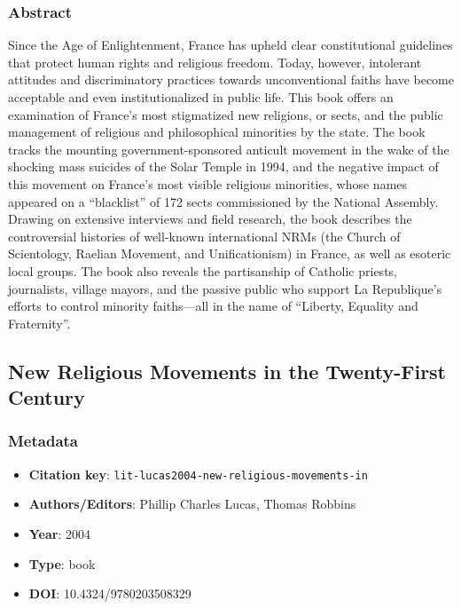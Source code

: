 \subsubsection*{Abstract}
Since the Age of Enlightenment, France has upheld clear constitutional guidelines that protect human rights and religious freedom. Today, however, intolerant attitudes and discriminatory practices towards unconventional faiths have become acceptable and even institutionalized in public life. This book offers an examination of France's most stigmatized new religions, or sects, and the public management of religious and philosophical minorities by the state. The book tracks the mounting government-sponsored anticult movement in the wake of the shocking mass suicides of the Solar Temple in 1994, and the negative impact of this movement on France's most visible religious minorities, whose names appeared on a “blacklist” of 172 sects commissioned by the National Assembly. Drawing on extensive interviews and field research, the book describes the controversial histories of well-known international NRMs (the Church of Scientology, Raelian Movement, and Unificationism) in France, as well as esoteric local groups. The book also reveals the partisanship of Catholic priests, journalists, village mayors, and the passive public who support La Republique's efforts to control minority faiths—all in the name of “Liberty, Equality and Fraternity”.

\subsection{New Religious Movements in the Twenty-First Century}\label{lit:lit-lucas2004-new-religious-movements-in}
\subsubsection*{Metadata}
\begin{itemize}
  \item \textbf{Citation key}: \texttt{lit-lucas2004-new-religious-movements-in}
  \item \textbf{Authors/Editors}: Phillip Charles Lucas, Thomas Robbins
  \item \textbf{Year}: 2004
  \item \textbf{Type}: book
  \item \textbf{DOI}: 10.4324/9780203508329
\end{itemize}
